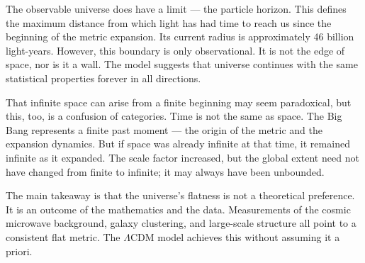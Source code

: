 The observable universe does have a limit — the particle horizon. This defines the maximum distance from which light has had time to reach us since the beginning of the metric expansion. Its current radius is approximately 46 billion light-years. However, this boundary is only observational. It is not the edge of space, nor is it a wall. The model suggests that universe continues with the same statistical properties forever in all directions.

That infinite space can arise from a finite beginning may seem paradoxical, but this, too, is a confusion of categories. Time is not the same as space. The Big Bang represents a finite past moment — the origin of the metric and the expansion dynamics. But if space was already infinite at that time, it remained infinite as it expanded. The scale factor increased, but the global extent need not have changed from finite to infinite; it may always have been unbounded.

The main takeaway is that the universe's flatness is not a theoretical preference. It is an outcome of the mathematics and the data. Measurements of the cosmic microwave background, galaxy clustering, and large-scale structure all point to a consistent flat metric. The $\Lambda$CDM model achieves this without assuming it a priori. 

\newpage
\thispagestyle{empty}

